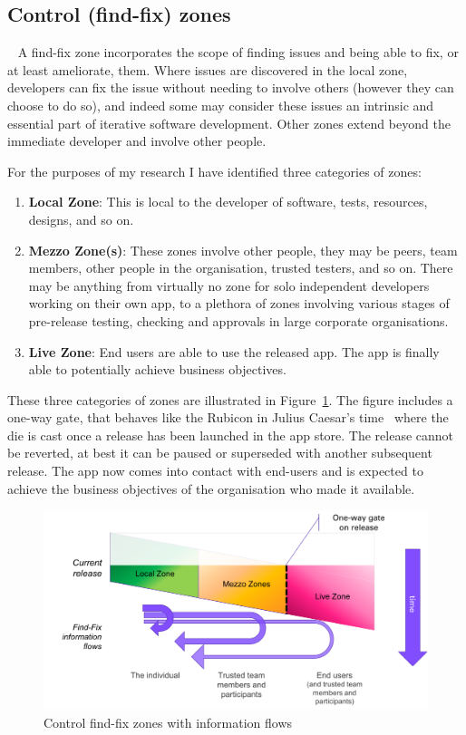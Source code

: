 \subsection{Control (find-fix) zones}~\label{ptg-control-find-fix-zones-topic}
A find-fix zone incorporates the scope of finding issues and being able to fix, or at least ameliorate, them. Where issues are discovered in the local zone, developers can fix the issue without needing to involve others (however they can choose to do so), and indeed some may consider these issues an intrinsic and essential part of iterative software development. Other zones extend beyond the immediate developer and involve other people.

For the purposes of my research I have identified three categories of zones:
\begin{enumerate}
    \item \textbf{Local Zone}: This is local to the developer of software, tests, resources, designs, and so on.
    \item \textbf{Mezzo Zone(s)}: These zones involve other people, they may be peers, team members, other people in the organisation, trusted testers, and so on. There may be anything from virtually no zone for solo independent developers working on their own app, to a plethora of zones involving various stages of pre-release testing, checking and approvals in large corporate organisations.
    \item \textbf{Live Zone}: End users are able to use the released app. The app is finally able to potentially achieve business objectives. 
\end{enumerate}

These three categories of zones are illustrated in Figure~\ref{fig:my:control-find-fix-zones-with-information-flows}. The figure includes a one-way gate, that behaves like the Rubicon in Julius Caesar's time~ where the die is cast once a release has been launched in the app store. The release cannot be reverted, at best it can be paused or superseded with another subsequent release. The app now comes into contact with end-users and is expected to achieve the business objectives of the organisation who made it available.

\begin{figure}
    \includegraphics[width=\linewidth]{images/my/control-find-fix-zones-with-information-flows.pdf}
    \caption{Control find-fix zones with information flows}
    \label{fig:my:control-find-fix-zones-with-information-flows}
\end{figure}

